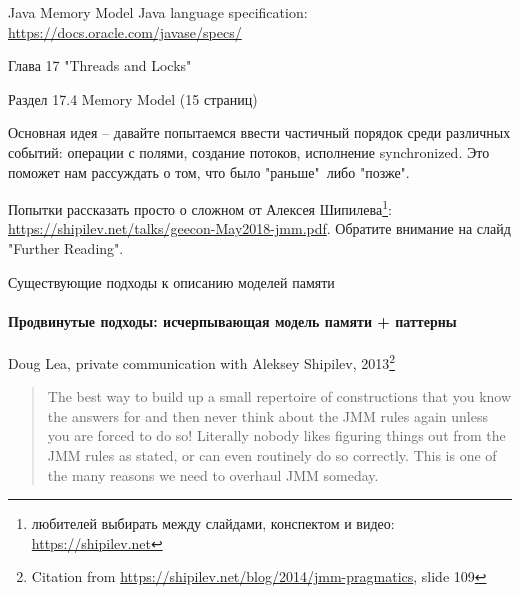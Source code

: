 \begin{frame}[t,noframenumbering]{Java Memory Model}
Java language specification: \url{https://docs.oracle.com/javase/specs/}

Глава 17 "Threads and Locks"

Раздел 17.4 Memory Model (15 страниц)

Основная идея -- давайте попытаемся ввести частичный порядок среди различных событий: операции с полями, создание потоков, исполнение synchronized.
Это поможет нам рассуждать о том, что было "раньше"\ либо "позже".


Попытки рассказать просто о сложном от Алексея Шипилева\footnote{ любителей выбирать между слайдами, конспектом и видео: \url{https://shipilev.net}}: \url{https://shipilev.net/talks/geecon-May2018-jmm.pdf}. Обратите внимание на слайд "Further Reading".

\end{frame}


\begin{frame}{Существующие подходы к описанию моделей памяти}
\framesubtitle{Продвинутые подходы: исчерпывающая модель памяти + паттерны}

Doug Lea, private communication with Aleksey Shipilev, 2013\footnote{\tiny Citation from \url{https://shipilev.net/blog/2014/jmm-pragmatics}, slide 109}

\begin{quote}
The best way to build up a small repertoire of constructions that you know the answers for and then never think about the JMM rules again unless you are forced to do so! Literally nobody likes figuring things out from the JMM rules as stated, or can even routinely do so correctly.
This is one of the many reasons we need to overhaul JMM someday.
\end{quote}
\end{frame}


